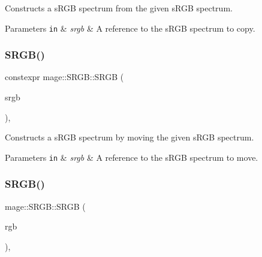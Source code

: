 Constructs a s\+R\+GB spectrum from the given s\+R\+GB spectrum.


\begin{DoxyParams}[1]{Parameters}
\mbox{\tt in}  & {\em srgb} & A reference to the s\+R\+GB spectrum to copy. \\
\hline
\end{DoxyParams}
\mbox{\label{structmage_1_1_s_r_g_b_aca835f4281827524ad14345ddb28208a}} 
\subsubsection{\texorpdfstring{S\+R\+G\+B()}{SRGB()}\hspace{0.1cm}{\footnotesize\ttfamily [4/6]}}
{\footnotesize\ttfamily constexpr mage\+::\+S\+R\+G\+B\+::\+S\+R\+GB (\begin{DoxyParamCaption}\item[{\mbox{\hyperlink{structmage_1_1_s_r_g_b}{S\+R\+GB}} \&\&}]{srgb }\end{DoxyParamCaption})\hspace{0.3cm}{\ttfamily [default]}, {\ttfamily [noexcept]}}

Constructs a s\+R\+GB spectrum by moving the given s\+R\+GB spectrum.


\begin{DoxyParams}[1]{Parameters}
\mbox{\tt in}  & {\em srgb} & A reference to the s\+R\+GB spectrum to move. \\
\hline
\end{DoxyParams}
\mbox{\label{structmage_1_1_s_r_g_b_a4b56eeabfaee47d0f0685a061947ce59}} 
\subsubsection{\texorpdfstring{S\+R\+G\+B()}{SRGB()}\hspace{0.1cm}{\footnotesize\ttfamily [5/6]}}
{\footnotesize\ttfamily mage\+::\+S\+R\+G\+B\+::\+S\+R\+GB (\begin{DoxyParamCaption}\item[{const \mbox{\hyperlink{structmage_1_1_r_g_b}{R\+GB}} \&}]{rgb }\end{DoxyParamCaption})\hspace{0.3cm}{\ttfamily [explicit]}, {\ttfamily [noexcept]}}

